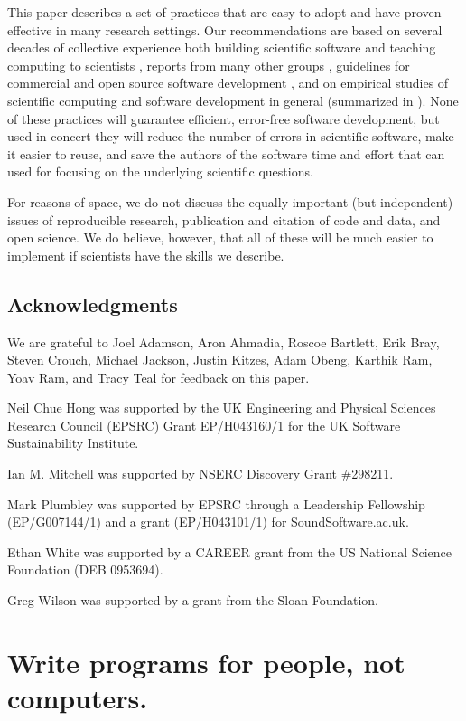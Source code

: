 \documentclass[10pt]{article}
\newcommand{\practicesection}[2]{\section{#1}\label{#2}}
\begin{document}
This paper describes a set of practices that are easy to adopt and
have proven effective in many research settings.  Our recommendations
are based on several decades of collective experience both building
scientific software and teaching computing to scientists
\cite{aranda2012,wilson2006b}, reports from many other groups
\cite{heroux2009,kane2003,kane2006,killcoyne2009,matthews2008,pitt-francis2008,pouillon2010},
guidelines for commercial and open source software development
\cite{spolsky2000,fogel2005}, and on empirical studies of scientific
computing \cite{carver2007,kelly2009,segal2005,segal2008a} and
software development in general (summarized in \cite{oram2010}). None
of these practices will guarantee efficient, error-free software
development, but used in concert they will reduce the number of errors
in scientific software, make it easier to reuse, and save the authors
of the software time and effort that can used for focusing on the
underlying scientific questions.

For reasons of space,
we do not discuss the equally important (but independent) issues of
reproducible research,
publication and citation of code and data,
and open science.
We do believe,
however,
that all of these will be much easier to implement
if scientists have the skills we describe.

\subsection*{Acknowledgments}

We are grateful to
Joel Adamson,
Aron Ahmadia,
Roscoe Bartlett,
Erik Bray,
Steven Crouch,
Michael Jackson,
Justin Kitzes,
Adam Obeng,
Karthik Ram,
Yoav Ram,
and Tracy Teal
for feedback on this paper.

Neil Chue Hong was supported by the UK Engineering and Physical
Sciences Research Council (EPSRC) Grant EP/H043160/1 for the UK
Software Sustainability Institute.

Ian M. Mitchell was supported by NSERC Discovery Grant \#298211.

Mark Plumbley was supported by EPSRC through a Leadership Fellowship
(EP/G007144/1) and a grant (EP/H043101/1) for SoundSoftware.ac.uk.

Ethan White was supported by a CAREER grant from the US National
Science Foundation (DEB 0953694).

Greg Wilson was supported by a grant from the Sloan Foundation.

\practicesection{Write programs for people, not computers.}{cognition}
\end{document}
